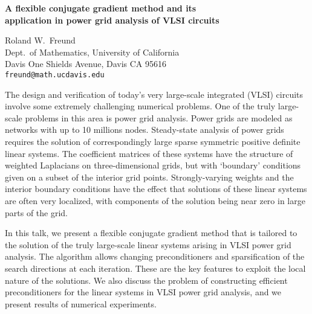\documentclass{report}
\begin{document}

\begin{center}
{\large
{\bf A flexible conjugate gradient method and its \\
application in power grid analysis of VLSI circuits}}

	Roland W.~Freund \\
	Dept.~of Mathematics, University of California \\
	Davis One Shields Avenue, Davis CA 95616 \\
	{\tt freund@math.ucdavis.edu}
\end{center}
The design and verification of today's very large-scale
integrated (VLSI) circuits involve some extremely
challenging numerical problems. One of the truly large-scale
problems in this area is power grid analysis. Power grids
are modeled as networks with up to 10 millions nodes.
Steady-state analysis of power grids requires the solution
of correspondingly large sparse symmetric positive definite
linear systems. The coefficient matrices of these systems
have the structure of weighted Laplacians on
three-dimensional grids, but with `boundary' conditions
given on a subset of the interior grid points.
Strongly-varying weights and the interior boundary
conditions have the effect that solutions of these linear
systems are often very localized, with components of the
solution being near zero in large parts of the grid.

In this
talk, we present a flexible conjugate gradient method that
is tailored to the solution of the truly large-scale linear
systems arising in VLSI power grid analysis. The algorithm
allows changing preconditioners and sparsification of the
search directions at each iteration. These are the key
features to exploit the local nature of the solutions. We
also discuss the problem of constructing efficient
preconditioners for the linear systems in VLSI power grid
analysis, and we present results of numerical experiments.


\end{document}
